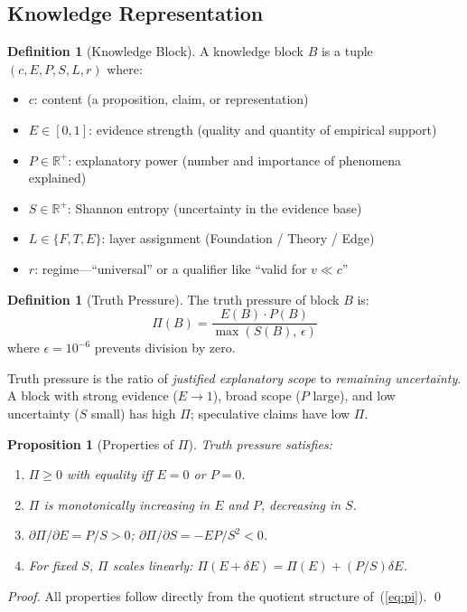 \documentclass[11pt,a4paper]{article}
\newtheorem{proposition}[theorem]{Proposition}
\theoremstyle{definition}
\newtheorem{definition}[theorem]{Definition}
\newcommand{\R}{\mathbb{R}}
\newcommand{\tp}{\Pi}
\begin{document}
\subsection{Knowledge Representation}

\begin{definition}[Knowledge Block]\label{def:block}
A knowledge block $B$ is a tuple $(c, E, P, S, L, r)$ where:
\begin{itemize}[nosep,leftmargin=*]
\item $c$: content (a proposition, claim, or representation)
\item $E \in [0,1]$: evidence strength (quality and quantity of empirical support)
\item $P \in \R^+$: explanatory power (number and importance of phenomena explained)
\item $S \in \R^+$: Shannon entropy (uncertainty in the evidence base)
\item $L \in \{F, T, E\}$: layer assignment (Foundation / Theory / Edge)
\item $r$: regime---``universal'' or a qualifier like ``valid for $v \ll c$''
\end{itemize}
\end{definition}

\begin{definition}[Truth Pressure]\label{def:pi}
The truth pressure of block $B$ is:
\begin{equation}\label{eq:pi}
\tp(B) = \frac{E(B) \cdot P(B)}{\max(S(B),\, \epsilon)}
\end{equation}
where $\epsilon = 10^{-6}$ prevents division by zero.
\end{definition}

Truth pressure is the ratio of \emph{justified explanatory scope} to \emph{remaining uncertainty}. A block with strong evidence ($E \to 1$), broad scope ($P$ large), and low uncertainty ($S$ small) has high $\tp$; speculative claims have low $\tp$.

\begin{proposition}[Properties of $\tp$]\label{prop:pi_props}
Truth pressure satisfies:
\begin{enumerate}[nosep]
\item $\tp \geq 0$ with equality iff $E = 0$ or $P = 0$.
\item $\tp$ is monotonically increasing in $E$ and $P$, decreasing in $S$.
\item $\partial\tp / \partial E = P/S > 0$; $\partial\tp / \partial S = -EP/S^2 < 0$.
\item For fixed $S$, $\tp$ scales linearly: $\tp(E + \delta E) = \tp(E) + (P/S)\delta E$.
\end{enumerate}
\end{proposition}
\begin{proof}
All properties follow directly from the quotient structure of~(\ref{eq:pi}). \qed
\end{proof}
\end{document}
